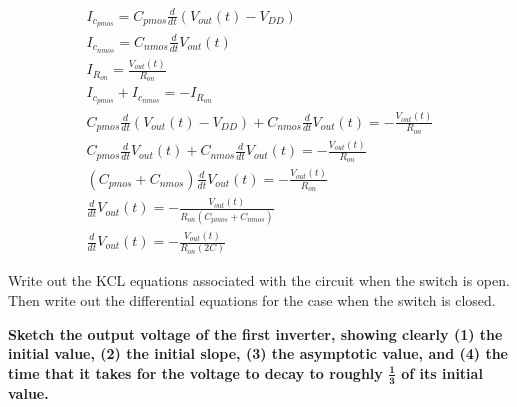 \begin{enumerate}
{\begin{align*}
I_{c_{pmos}} = C_{pmos} \frac{d}{dt}(V_{out}(t) - V_{DD}) \\
I_{c_{nmos}} = C_{nmos} \frac{d}{dt}V_{out}(t) \\
I_{R_{on}} = \frac{V_{out}(t)}{R_{on}} \\
I_{c_{pmos}} + I_{c_{nmos}} = -I_{R_{on}} \\
C_{pmos} \frac {d}{dt} (V_{out}(t) - V_{DD}) + C_{nmos} \frac {d}{dt} V_{out}(t) = - \frac {V_{out}(t)}{R_{on}} \\
C_{pmos} \frac {d}{dt} V_{out}(t) + C_{nmos} \frac{d}{dt} V_{out}(t) = - \frac {V_{out} (t)} {R_{on}} \\
(C_{pmos} + C_{nmos}) \frac {d}{dt} V_{out} (t) = - \frac {V_{out}(t)} {R_{on}} \\
\frac {d}{dt} V_{out}(t) = - \frac {V_{out} (t)} {R_{on} (C_{pmos} + C_{nmos})} \\
\frac {d}{dt} V_{out} (t) = - \frac {V_{out} (t)} {R_{on} (2C)}
\end{align*}
}

\qitem Write out the KCL equations associated with the circuit when the switch is open. Then write out the differential equations for the case when the switch is closed.





\qitem \textbf{Sketch the output voltage of the first inverter, showing clearly (1) the initial value, (2) the initial slope, (3) the asymptotic value, and (4) the time that it takes for the voltage to decay to roughly $\mathbf{\frac{1}{3}}$ of its initial value.}


\end{enumerate}
